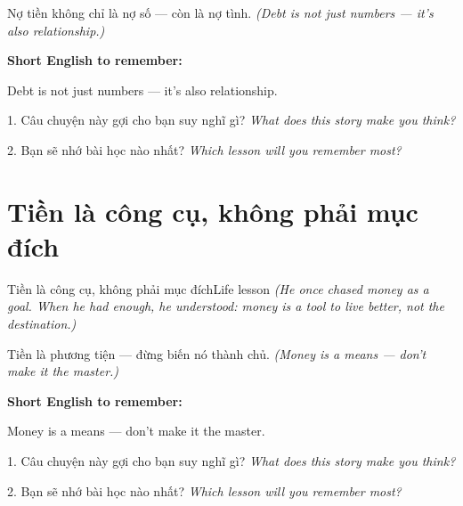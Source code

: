 \begin{baihoc}
Nợ tiền không chỉ là nợ số — còn là nợ tình.
\textit{(Debt is not just numbers — it's also relationship.)}
\end{baihoc}

\begin{ghinhoanh}
\textbf{Short English to remember:}

Debt is not just numbers — it's also relationship.

\end{ghinhoanh}

\begin{tuhocnhanh}
1. Câu chuyện này gợi cho bạn suy nghĩ gì? \textit{What does this story make you think?}

2. Bạn sẽ nhớ bài học nào nhất? \textit{Which lesson will you remember most?}
\end{tuhocnhanh}
\ngancach


\section{Tiền là công cụ, không phải mục đích}
\begin{truyen}{Tiền là công cụ, không phải mục đích}{Life lesson}
\textit{(He once chased money as a goal. When he had enough, he understood: money is a tool to live better, not the destination.)}
\end{truyen}

\begin{baihoc}
Tiền là phương tiện — đừng biến nó thành chủ.
\textit{(Money is a means — don't make it the master.)}
\end{baihoc}

\begin{ghinhoanh}
\textbf{Short English to remember:}

Money is a means — don't make it the master.

\end{ghinhoanh}

\begin{tuhocnhanh}
1. Câu chuyện này gợi cho bạn suy nghĩ gì? \textit{What does this story make you think?}

2. Bạn sẽ nhớ bài học nào nhất? \textit{Which lesson will you remember most?}
\end{tuhocnhanh}
\ngancach
